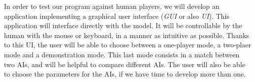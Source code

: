 In order to test our program against human players, we will develop an application implementing a graphical user interface (\emph{GUI} or also \emph{UI}).
This application will interface directly with the model.
It will be controllable by the human with the mouse or keyboard, in a manner as intuitive as possible.
Thanks to this UI, the user will be able to choose between a one-player mode, a two-plaer mode and a demonstration mode.
This last mode consists in a match between two AIs, and will be helpful to compare different AIs.
The user will also be able to choose the parameters for the AIs, if we have time to develop more than one.